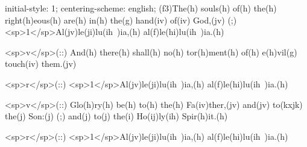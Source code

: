 initial-style: 1;
centering-scheme: english;
(f3)The(h) souls(h) of(h) the(h) right(h)eous(h) are(h) in(h) the(g) hand(iv) of(iv) God,(jv) (;) <sp>1</sp>Al(jv)le(ji)lu(ih~)ia,(h) al(f)le(hi)lu(ih~)ia.(h)

<sp>v</sp>(::) And(h) there(h) shall(h) no(h) tor(h)ment(h) of(h) e(h)vil(g) touch(iv) them.(jv)

<sp>r</sp>(::) <sp>1</sp>Al(jv)le(ji)lu(ih~)ia,(h) al(f)le(hi)lu(ih~)ia.(h)

<sp>v</sp>(::) Glo(h)ry(h) be(h) to(h) the(h) Fa(iv)ther,(jv) and(jv) to(kxjk) the(j) Son:(j) (;) and(j) to(j) the(i) Ho(ij)ly(ih) Spir(h)it.(h)

<sp>r</sp>(::) <sp>1</sp>Al(jv)le(ji)lu(ih~)ia,(h) al(f)le(hi)lu(ih~)ia.(h)